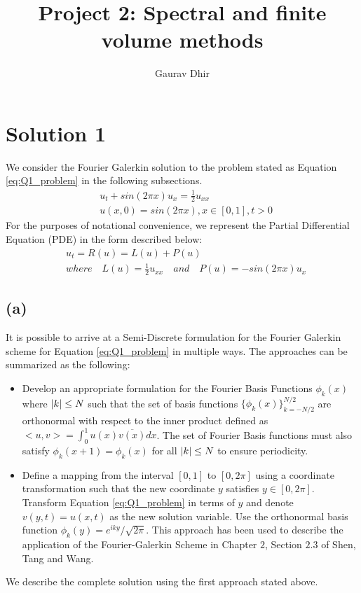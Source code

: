 \documentclass[12pt,dvipsnames]{article}
\DeclarePairedDelimiter\abs{\lvert}{\rvert}
\newcommand{\an}[1]{{\leavevmode\color{BrickRed}{#1}}}
\begin{document}
\title{Project 2: Spectral and finite volume methods}
\author{Gaurav Dhir}
\maketitle
\section{Solution 1}
We consider the Fourier Galerkin solution to the problem stated as Equation \ref{eq:Q1_problem} in the following subsections.
\begin{equation}
\begin{aligned}
& u_t + sin(2 \pi x)u_x = \frac{1}{2}u_{xx} \\
& u(x, 0) = sin( 2 \pi x ), x \in [0, 1], t > 0
\end{aligned}
\label{eq:Q1_problem}
\end{equation}
For the purposes of notational convenience, we represent the Partial Differential Equation (PDE) in the form described below:
\begin{equation}
    \begin{aligned}
        & u_t = R(u) = L(u) + P(u) \\
        & where \quad L(u) = \frac{1}{2}u_{xx} \quad and \quad P(u) = -sin(2 \pi x)u_x
    \end{aligned}
\label{eq:simplified}
\end{equation}
\subsection{(a)}
It is possible to arrive at a Semi-Discrete formulation for the Fourier Galerkin scheme for Equation \ref{eq:Q1_problem} in multiple ways.  The approaches can be summarized as the following:
\begin{itemize}
    \item Develop an appropriate formulation for the Fourier Basis Functions $\phi_k(x)$ where $\abs{k} \leq N$ such that the set of basis functions $\{ \phi_k(x) \}_{k = -N/2}^{N/2}$ are orthonormal with respect to the inner product defined as $<u, v> = \int_0^1 u(x) \overline{v(x)} dx$. 
      \an{I guess above you mean $|k| \leq N/2$ instead of $|k| \leq N$.}
      The set of Fourier Basis functions must also satisfy $\phi_k(x + 1) = \phi_k(x)$ for all $\abs{k} \leq N$ to ensure periodicity.
    \item Define a mapping from the interval $[0, 1]$ to $[0, 2 \pi]$ using a coordinate transformation such that the new coordinate $y$ satisfies $y \in [0, 2 \pi]$. Transform Equation \ref{eq:Q1_problem} in terms of $y$ and denote $v(y, t) = u(x, t)$ as the new solution variable. Use the orthonormal basis function $\phi_k(y) = e^{i k y}/\sqrt{2 \pi}$. This approach has been used to describe the application of the Fourier-Galerkin Scheme in Chapter $2$, Section $2.3$ of Shen, Tang and Wang. 
\end{itemize}
We describe the complete solution using the first approach stated above.
\end{document}
